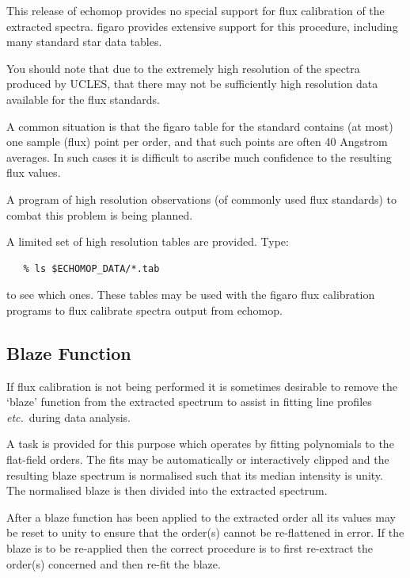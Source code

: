 \documentclass[twoside,11pt]{article}
\newcommand{\xref}[3]{#1}
\newcommand{\xlabel}[1]{}
\renewcommand{\_}{\texttt{\symbol{95}}}
\newcommand{\mlabel}[1]{\xlabel{#1}\label{#1}}
\newcommand{\myindex}[1]{\index{#1}}
\newcommand{\myindex}[1]{}
\begin{document}
This release of {\sc echomop} provides no special support for flux
calibration of the extracted spectra.
\xref{{\sc figaro}}{sun86}{} provides extensive support for this procedure,
including many standard star data tables.

You should note that due to the extremely high resolution of the
spectra produced by UCLES, that there may not be sufficiently
high resolution data available for the flux standards.

A common situation is that the \xref{{\sc figaro}}{sun86}{} table for the
standard contains (at most) one sample (flux) point per order, and that
such points are often 40 Angstrom averages. In such cases it is difficult
to ascribe much confidence to the resulting flux values.

A program of high resolution observations (of commonly used flux
standards) to combat this problem is being planned.

A limited set of high resolution tables are provided. Type:

\begin{verbatim}
   % ls $ECHOMOP_DATA/*.tab
\end{verbatim}

to see which ones. These tables may be used with the
\xref{{\sc figaro}}{sun86}{} flux calibration programs
to flux calibrate spectra output from {\sc echomop}.


\subsection{\mlabel{blaze_function}Blaze Function}
\myindex{Blaze}
\myindex{Ripple}

If flux calibration is not being performed it is sometimes desirable
to remove the `blaze' function from the extracted spectrum to assist
in fitting line profiles {\it etc.}\ during data analysis.

A task is provided for this purpose which operates by fitting
polynomials to the flat-field orders. The fits may be automatically
or interactively clipped and the resulting blaze spectrum is
normalised such that its median intensity is unity. The normalised
blaze is then divided into the extracted spectrum.

After a blaze function has been applied to the extracted order all
its values may be reset to unity to ensure that the order(s) cannot
be re-flattened in error. If the blaze is to be
re-applied then the correct procedure is to first re-extract the
order(s) concerned and then re-fit the blaze.
\end{document}
